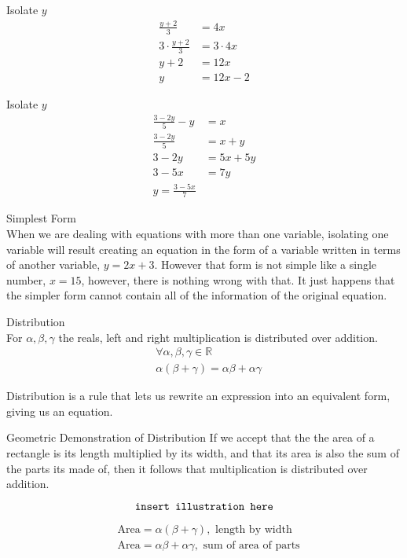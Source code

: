 \documentclass{book}
\begin{document}
  {\example Isolate $y$ \\
    \begin{align*}
      \frac{y + 2}{3} & = 4x\\
      3 \cdot \frac{y + 2}{3} & = 3 \cdot 4x\\
      y + 2 & = 12x\\
      y & = 12x - 2
    \end{align*}
  }

  {\example Isolate $y$ \\
    \begin{align*}
      \frac{3 - 2y}{5} - y & = x\\
      \frac{3 - 2y}{5} & = x + y\\
      3 - 2y & = 5x + 5y\\
      3 - 5x & = 7y\\
      y = \frac{3 - 5x}{7}
    \end{align*}
  }

  {\remark Simplest Form \\
    When we are dealing with equations with more than one variable, isolating one variable will result creating an equation in the form of a variable written in terms of another variable, $y = 2x + 3$. However that form is not simple like a single number, $x = 15$, however, there is nothing wrong with that. It just happens that the simpler form cannot contain all of the information of the original equation.\\
  }

  {\axiom Distribution \\
    For $\alpha, \beta, \gamma$ the reals, left and right multiplication is distributed over addition.
    \begin{align*}
      & \forall \alpha, \beta, \gamma \in \mathbb{R}\\
      & \alpha (\beta + \gamma) = \alpha \beta + \alpha \gamma
    \end{align*}

    Distribution is a rule that lets us rewrite an expression into an equivalent form, giving us an equation.\\
  }

  {\remark Geometric Demonstration of Distribution 
    If we accept that the the area of a rectangle is its length multiplied by its width, and that its area is also the sum of the parts its made of, then it follows that multiplication is distributed over addition.

    $$\text{\texttt{insert illustration here}}$$

    \begin{align*}
      & \text{Area} = \alpha (\beta + \gamma), \text{ length by width}\\
      & \text{Area} = \alpha \beta + \alpha \gamma, \text{ sum of area of parts}
    \end{align*}
  }
\end{document}
